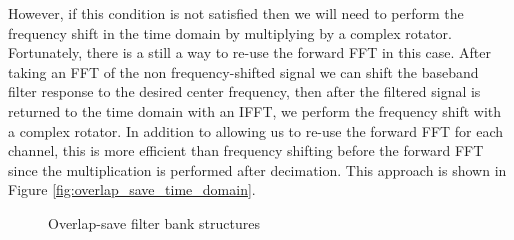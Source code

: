 \documentclass[12pt]{article}
\begin{document}
However, if this condition is not satisfied then we will need to perform the
frequency shift in the time domain by multiplying by a complex rotator.
Fortunately, there is a still a way to re-use the forward FFT in this case.
After taking an FFT of the non frequency-shifted signal we can shift the
baseband filter response to the desired center frequency, then after the
filtered signal is returned to the time domain with an IFFT, we perform the
frequency shift with a complex rotator.  In addition to allowing us to re-use
the forward FFT for each channel, this is more efficient than frequency
shifting before the forward FFT since the multiplication is performed after
decimation. This approach is shown in Figure
\ref{fig:overlap_save_time_domain}.

\begin{figure}[bh!]
\centerline{
    \hfill
}
\caption{Overlap-save filter bank structures}
\label{fig:overlap_save_filter_banks}
\end{figure}
\end{document}
